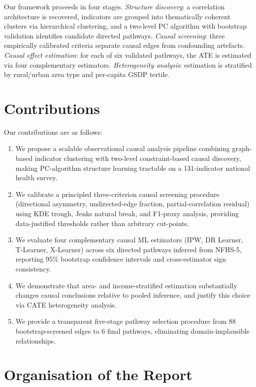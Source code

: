 \documentclass[12pt,a4paper]{report}
\begin{document}
Our framework proceeds in four stages.
\emph{Structure discovery}: a correlation architecture is recovered, indicators are
grouped into thematically coherent clusters via hierarchical clustering, and a
two-level PC algorithm \citep{spirtes2000causation} with bootstrap validation
identifies candidate directed pathways.
\emph{Causal screening}: three empirically calibrated criteria separate causal edges
from confounding artefacts.
\emph{Causal effect estimation}: for each of six validated pathways, the ATE is
estimated via four complementary estimators.
\emph{Heterogeneity analysis}: estimation is stratified by rural/urban area type
and per-capita GSDP tertile.

\section{Contributions}

Our contributions are as follows:
\begin{enumerate}[leftmargin=*,itemsep=4pt]
\item We propose a scalable observational causal analysis pipeline combining
  graph-based indicator clustering with two-level constraint-based causal discovery,
  making PC-algorithm structure learning tractable on a 131-indicator national health
  survey.
\item We calibrate a principled three-criterion causal screening procedure
  (directional asymmetry, undirected-edge fraction, partial-correlation residual)
  using KDE trough, Jenks natural break, and F1-proxy analysis, providing
  data-justified thresholds rather than arbitrary cut-points.
\item We evaluate four complementary causal ML estimators (IPW, DR Learner,
  T-Learner, X-Learner) across six directed pathways inferred from NFHS-5,
  reporting 95\% bootstrap confidence intervals and cross-estimator sign consistency.
\item We demonstrate that area- and income-stratified estimation substantially
  changes causal conclusions relative to pooled inference, and justify this choice
  via CATE heterogeneity analysis.
\item We provide a transparent five-stage pathway selection procedure from 88
  bootstrap-screened edges to 6 final pathways, eliminating domain-implausible
  relationships.
\end{enumerate}

\section{Organisation of the Report}
\end{document}
